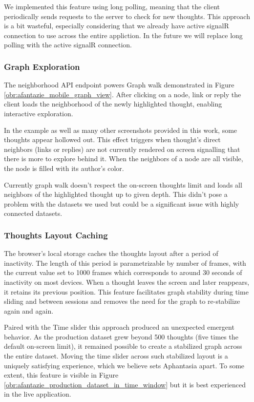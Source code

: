 We implemented this feature using long polling, meaning that the client periodically sends
requests to the server to check for new thoughts. This approach is a bit wasteful, especially considering that we already have active
signalR connection to use across the entire appliction.
In the future we will replace long polling with the active signalR connection.

\subsubsection*{Graph Exploration}
The neighborhood API endpoint powers Graph walk demonstrated in Figure \ref{obr:afantazie_mobile_graph_view}.
After clicking on a node, link or reply the client loads the neighborhood of the newly highlighted thought, enabling interactive exploration.

In the example as well as many other screenshots provided in this work, some thoughts appear hollowed out.
This effect triggers when thought's direct neighbors (links or replies) are not currently rendered on screen
signalling that there is more to explore behind it.
When the neighbors of a node are all visible, the node is filled with its author's color.

Currently graph walk doesn't respect the on-screen thoughts limit and loads all neighbors of the highlighted thought up to given depth. This didn't pose a problem with the datasets we used but could be a significant issue with highly connected datasets.

\subsubsection*{Thoughts Layout Caching}
The browser’s local storage caches the thoughts layout after a period of inactivity.
The length of this period is parametrizable by number of frames,
with the current value set to 1000 frames which corresponds to around 30 seconds of inactivity on most devices.
When a thought leaves the screen and later reappears, it retains its previous position.
This feature facilitates graph stability during time sliding and between sessions and removes the need for the graph to re-stabilize again and again.

Paired with the Time slider this approach produced an unexpected emergent behavior. As the \gls{production} dataset grew beyond 500 thoughts (five times the default on-screen limit), it remained possible to create a stabilized graph across the entire dataset.
Moving the time slider across such stabilized layout is a uniquely satisfying experience, which we believe sets Aphantasia apart.
To some extent, this feature is visible in Figure \ref{obr:afantazie_production_dataset_in_time_window} but it is best experienced in the live application.

